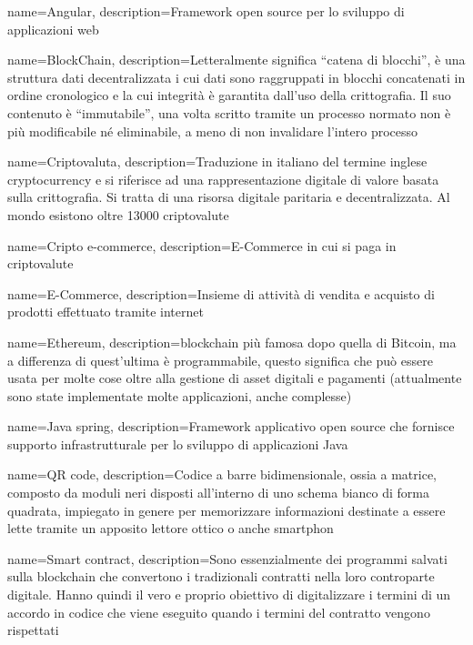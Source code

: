 {
	name={Angular},
	description={Framework open source\glo{} per lo sviluppo di applicazioni web}
}

{
	name={BlockChain},
	description={Letteralmente significa “catena di blocchi”, è una struttura dati decentralizzata i cui dati sono raggruppati in blocchi concatenati in ordine cronologico e la cui integrità è garantita dall'uso della crittografia. Il suo contenuto è “immutabile”, una volta scritto tramite un processo normato non è più modificabile né eliminabile, a meno di non invalidare l'intero processo}
}

{
	name={Criptovaluta},
	description={Traduzione in italiano del termine inglese cryptocurrency e si riferisce ad una rappresentazione digitale di valore basata sulla crittografia. Si tratta di una risorsa digitale paritaria e decentralizzata. Al mondo esistono oltre 13000 criptovalute\glo}
}

{
	name={Cripto e-commerce},
	description={E-Commerce in cui si paga in criptovalute\glo}
}

{
	name={E-Commerce},
	description={Insieme di attività di vendita e acquisto di prodotti effettuato tramite internet}
}

{
	name={Ethereum},
	description={blockchain\glo{} più famosa dopo quella di Bitcoin\glo{}, ma a differenza di quest'ultima è programmabile, questo significa che può essere usata per molte cose oltre alla gestione di asset digitali e pagamenti (attualmente sono state implementate molte applicazioni, anche complesse)}
}

{
	name={Java spring},
	description={Framework applicativo open source\glo{} che fornisce supporto infrastrutturale per lo sviluppo di applicazioni Java}
}

{
	name={QR code},
	description={Codice a barre bidimensionale, ossia a matrice, composto da moduli neri disposti all'interno di uno schema bianco di forma quadrata, impiegato in genere per memorizzare informazioni destinate a essere lette tramite un apposito lettore ottico o anche smartphon}
}

{
	name={Smart contract},
	description={Sono essenzialmente dei programmi salvati sulla blockchain\glo{} che convertono i tradizionali contratti nella loro controparte digitale. Hanno quindi il vero e proprio obiettivo di digitalizzare i termini di un accordo in codice che viene eseguito quando i termini del contratto vengono rispettati}
}

